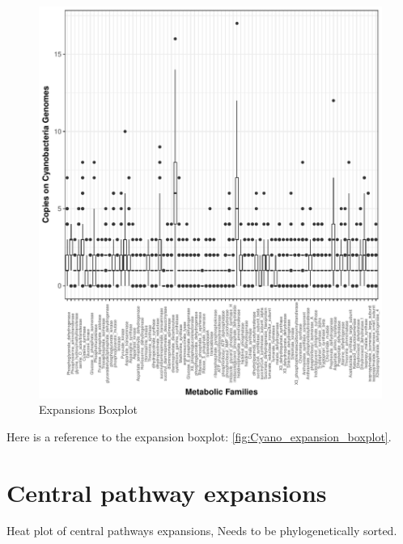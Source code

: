 \documentclass[12pt,twoside]{reedthesis}
\begin{document}
  \begin{figure}[h!tbp]
  \centering
  \includegraphics[angle = 0,scale = 1]{chapter2/Cyanobacteria/expansion_plotCyanos.pdf}
  \caption[Expansions Boxplot]{\normalsize{Expansions Boxplot}}
  \label{fig:Cyano_expansion_boxplot}
  \end{figure}
  
  Here is a reference to the expansion boxplot:
  \autoref{fig:Cyano_expansion_boxplot}.\\
  \clearpage 
  
  \section{Central pathway expansions}\label{central-pathway-expansions-2}
  
  Heat plot of central pathways expansions, Needs to be phylogenetically
  sorted.
  
\end{document}
